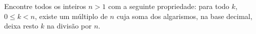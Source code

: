 Encontre todos os inteiros $n > 1$ com a seguinte propriedade: para todo $k$, $0 \le k < n$, existe um múltiplo de $n$ cuja soma dos algarismos, na base decimal, deixa resto $k$ na divisão por $n$.